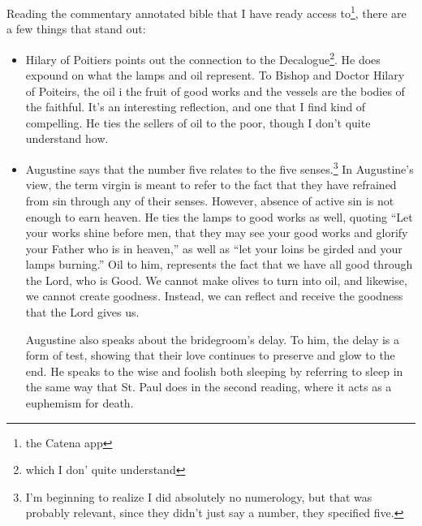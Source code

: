 \documentclass[12pt]{article}[titlepage]
\newcommand{\say}[1]{``#1''}
\newcommand{\1}{\={a}}
\newcommand{\2}{\={e}}
\newcommand{\3}{\={\i}}
\newcommand{\4}{\=o}
\newcommand{\5}{\=u}
\newcommand{\6}{\={A}}
\renewcommand{\,}{\textsuperscript{,}}
\begin{document}
Reading the commentary annotated bible that I have ready access to\footnote{the Catena app}, there are a few things that stand out:
\begin{itemize}
\item Hilary of Poitiers points out the connection to the Decalogue\footnote{which I don' quite understand}. He does expound on what the lamps and oil represent.
To Bishop and Doctor Hilary of Poiteirs, the oil i the fruit of good works and the vessels are the bodies of the faithful.
It's an interesting reflection, and one that I find kind of compelling.
He ties the sellers of oil to the poor, though I don't quite understand how.
\item Augustine says that the number five relates to the five senses.\footnote{I'm beginning to realize I did absolutely no numerology, but that was probably relevant, since they didn't just say a number, they specified five.}
In Augustine's view, the term virgin is meant to refer to the fact that they have refrained from sin through any of their senses.
However, absence of active sin is not enough to earn heaven.
He ties the lamps to good works as well, quoting \say{Let your works shine before men, that they may see your good works and glorify your Father who is in heaven,} as well as \say{let your loins be girded and your lamps burning.}
Oil to him, represents the fact that we have all good through the Lord, who is Good.
We cannot make olives to turn into oil, and likewise, we cannot create goodness.
Instead, we can reflect and receive the goodness that the Lord gives us.

Augustine also speaks about the bridegroom's delay.
To him, the delay is a form of test, showing that their love continues to preserve and glow to the end.
He speaks to the wise and foolish both sleeping by referring to sleep in the same way that St. Paul does in the second reading, where it acts as a euphemism for death.


\end{itemize}
\end{document}
